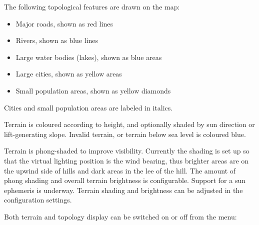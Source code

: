 \documentclass[a4paper,12pt]{refrep}
\begin{document}
The following topological features are drawn on the map:
\begin{itemize}
\item Major roads, shown as red lines
\item Rivers, shown as blue lines
\item Large water bodies (lakes), shown as blue areas
\item Large cities, shown as yellow areas
\item Small population areas, shown as yellow diamonds
\end{itemize}
Cities and small population areas are labeled in italics.

Terrain is coloured according to height, and optionally shaded by sun
direction or lift-generating slope.  Invalid terrain, or terrain below
sea level is coloured blue.

Terrain is phong-shaded to improve visibility.  Currently the shading
is set up so that the virtual lighting position is the wind bearing,
thus brighter areas are on the upwind side of hills and dark areas in
the lee of the hill.  The amount of phong shading and overall terrain
brightness is configurable.  Support for a sun ephemeris is underway.
Terrain shading and brightness can be adjusted in the configuration
settings.

Both terrain and topology display can be switched on or off from the
menu:
\begin{quote}
\blink{}
\end{quote}
\end{document}
